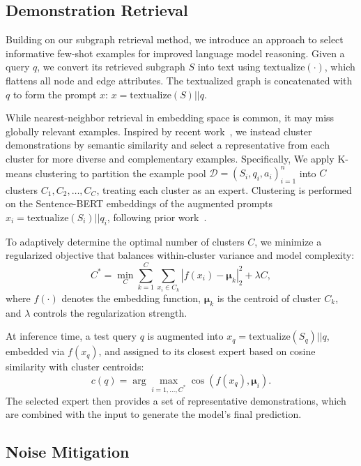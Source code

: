 \subsection{Demonstration Retrieval}

Building on our subgraph retrieval method, we introduce an approach to select informative few-shot examples for improved language model reasoning.
Given a query $q$, we convert its retrieved subgraph $S$ into text using $\text{textualize}(\cdot)$, which flattens all node and edge attributes. The textualized graph is concatenated with $q$ to form the prompt $x$: $x = \mathrm{textualize}(S)||q$.

While nearest-neighbor retrieval in embedding space is common, it may miss globally relevant examples. Inspired by recent work~\cite{onepromptisnotenough}, we instead cluster demonstrations by semantic similarity and select a representative from each cluster for more diverse and complementary examples.
Specifically, We apply K-means clustering to partition the example pool
$\mathcal{D} = {(S_i, q_i, a_i)}_{i=1}^n$
into $C$ clusters ${C_1, C_2, \dots, C_C}$, treating each cluster as an expert. Clustering is performed on the Sentence-BERT embeddings of the augmented prompts $x_i = \mathrm{textualize}(S_i) || q_i$, following prior work~\cite{gretriever}.

To adaptively determine the optimal number of clusters $C$, we minimize a regularized objective that balances within-cluster variance and model complexity:
\begin{equation}
C^* = \min_C \sum_{k=1}^{C} \sum_{x_i \in C_k} |f(x_i) - \boldsymbol{\mu}_k|_2^2 + \lambda C,
\end{equation}
where $f(\cdot)$ denotes the embedding function, $\boldsymbol{\mu}_k$ is the centroid of cluster $C_k$, and $\lambda$ controls the regularization strength.

At inference time, a test query $q$ is augmented into $x_q = \mathrm{textualize}(S_q) || q$, embedded via $f(x_q)$, and assigned to its closest expert based on cosine similarity with cluster centroids:
\begin{equation}
c(q) = \arg\max_{i = 1, \dots, C^*} \cos(f(x_q), \boldsymbol{\mu}_i).
\end{equation}
The selected expert then provides a set of representative demonstrations, which are combined with the input to generate the model’s final prediction.





\subsection{Noise Mitigation}

